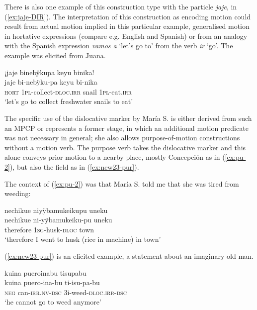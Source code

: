There is also one example of this construction type with the  particle \textit{jaje}, in (\ref{ex:jaje-DIR}). The interpretation of this construction as encoding motion could result from actual motion implied in this particular example, generalised motion in hortative expressions (compare e.g. English and Spanish) or from an analogy with the Spanish  expression \textit{vamos a} ‘let's go to’ from the verb \textit{ir} ‘go’. The example was elicited from Juana.

\ea\label{ex:jaje-DIR}
\begingl 
\glpreamble ¡jaje binebÿkupa keyu binika!\\
\gla jaje bi-nebÿku-pa keyu bi-nika\\ 
\glb \textsc{hort} 1\textsc{pl}-collect-\textsc{dloc.irr} snail 1\textsc{pl}-eat.\textsc{irr}\\ 
\glft ‘let's go to collect freshwater snails to eat’\\ 
\endgl
\trailingcitation{[jxx-e081025s-1.171]}
\xe

The specific use of the dislocative marker by María S. is either derived from such an MPCP or represents a former stage, in which an additional motion predicate was not necessary in general; she also allows purpose-of-motion constructions without a motion verb. The purpose verb takes the dislocative marker and this alone conveys prior motion to a nearby place, mostly Concepción as in (\ref{ex:pu-2}), but also the field as in (\ref{ex:new23-pur}).

The context of (\ref{ex:pu-2}) was that María S. told me that she was tired from weeding:

\ea\label{ex:pu-2}
\begingl 
\glpreamble nechikue niyÿbamukeikupu uneku\\
\gla nechikue ni-yÿbamukeiku-pu uneku\\ 
\glb therefore 1\textsc{sg}-husk-\textsc{dloc} town\\ 
\glft ‘therefore I went to husk (rice in machine) in town’\\ 
\endgl
\trailingcitation{[rxx-e120511l.035]}
\xe

(\ref{ex:new23-pur}) is an elicited example, a statement about an imaginary old man.

\ea\label{ex:new23-pur}
\begingl
\glpreamble kuina pueroinabu tisupabu\\
\gla kuina puero-ina-bu ti-isu-pa-bu\\
\glb \textsc{neg} can-\textsc{irr.nv}-\textsc{dsc} 3i-weed-\textsc{dloc.irr}-\textsc{dsc}\\
\glft ‘he cannot go to weed anymore’
\endgl
\trailingcitation{[rxx-e181022le]}
\xe

